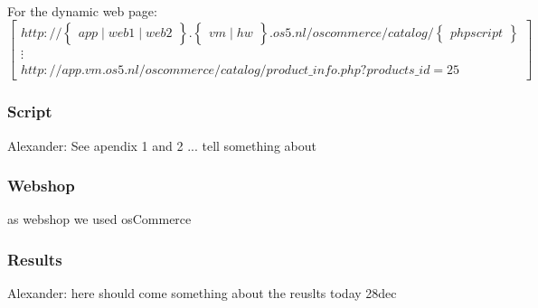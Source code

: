 \paragraph{}
For the dynamic web page:\\
$$ \begin{bmatrix}
http://  \begin{Bmatrix}app \mid web1 \mid web2 \end{Bmatrix} .  \begin{Bmatrix} vm \mid hw \end{Bmatrix} . os5 . nl /  oscommerce / catalog / \begin{Bmatrix} php script \end{Bmatrix}   \\ \vdots \\
http://  app .  vm . os5 . nl /  oscommerce / catalog / product\_info.php?products\_id=25   
\end{bmatrix}$$

\subsubsection{Script}
Alexander: See apendix 1 and 2 ... tell something about

\subsubsection{Webshop}
as webshop we used osCommerce




\subsubsection{Results}
Alexander: here should come something about the reuslts today 28dec

